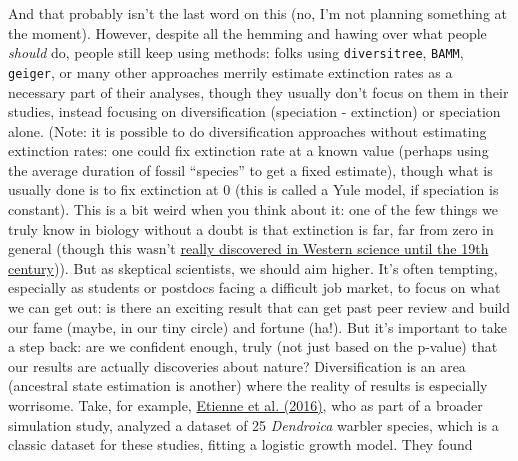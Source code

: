 \documentclass[]{book}
\theoremstyle{definition}
\theoremstyle{definition}
\theoremstyle{remark}
\begin{document}
And that probably isn't the last word on this (no, I'm not planning
something at the moment). However, despite all the hemming and hawing
over what people \emph{should} do, people still keep using methods:
folks using \texttt{diversitree}, \texttt{BAMM}, \texttt{geiger}, or
many other approaches merrily estimate extinction rates as a necessary
part of their analyses, though they usually don't focus on them in their
studies, instead focusing on diversification (speciation - extinction)
or speciation alone. (Note: it is possible to do diversification
approaches without estimating extinction rates: one could fix extinction
rate at a known value (perhaps using the average duration of fossil
``species'' to get a fixed estimate), though what is usually done is to
fix extinction at 0 (this is called a Yule model, if speciation is
constant). This is a bit weird when you think about it: one of the few
things we truly know in biology without a doubt is that extinction is
far, far from zero in general (though this wasn't
\href{http://www.ucmp.berkeley.edu/mammal/artio/irishelk.html}{really
discovered in Western science until the 19th century})). But as
skeptical scientists, we should aim higher. It's often tempting,
especially as students or postdocs facing a difficult job market, to
focus on what we can get out: is there an exciting result that can get
past peer review and build our fame (maybe, in our tiny circle) and
fortune (ha!). But it's important to take a step back: are we confident
enough, truly (not just based on the p-value) that our results are
actually discoveries about nature? Diversification is an area (ancestral
state estimation is another) where the reality of results is especially
worrisome. Take, for example,
\href{http://onlinelibrary.wiley.com/doi/10.1111/2041-210X.12565/abstract}{Etienne
et al. (2016)}, who as part of a broader simulation study, analyzed a
dataset of 25 \emph{Dendroica} warbler species, which is a classic
dataset for these studies, fitting a logistic growth model. They found
\end{document}
